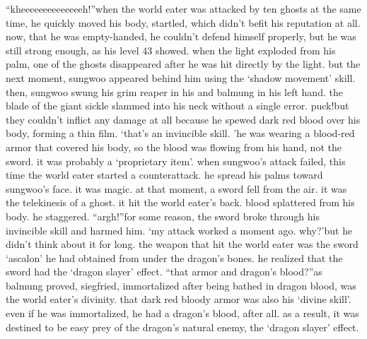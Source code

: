 “kheeeeeeeeeeeeeeh!”when the world eater was attacked by ten ghosts at the same time, he quickly moved his body, startled, which didn’t befit his reputation at all.
 now, that he was empty-handed, he couldn’t defend himself properly, but he was still strong enough, as his level 43 showed.
when the light exploded from his palm, one of the ghosts disappeared after he was hit directly by the light.
 but the next moment, sungwoo appeared behind him using the ‘shadow movement’ skill.
 then, sungwoo swung his grim reaper in his and balmung in his left hand.
the blade of the giant sickle slammed into his neck without a single error.
puck!but they couldn’t inflict any damage at all because he spewed dark red blood over his body, forming a thin film.
‘that’s an invincible skill.
’he was wearing a blood-red armor that covered his body, so the blood was flowing from his hand, not the sword.
 it was probably a ‘proprietary item’.
when sungwoo’s attack failed, this time the world eater started a counterattack.
 he spread his palms toward sungwoo’s face.
 it was magic.
at that moment, a sword fell from the air.
 it was the telekinesis of a ghost.
 it hit the world eater’s back.
blood splattered from his body.
 he staggered.
“argh!”for some reason, the sword broke through his invincible skill and harmed him.
‘my attack worked a moment ago.
 why?’but he didn’t think about it for long.
 the weapon that hit the world eater was the sword ‘ascalon’ he had obtained from under the dragon’s bones.
 he realized that the sword had the ‘dragon slayer’ effect.
“that armor and dragon’s blood?”as balmung proved, siegfried, immortalized after being bathed in dragon blood, was the world eater’s divinity.
 that dark red bloody armor was also his ‘divine skill’.
even if he was immortalized, he had a dragon’s blood, after all.
 as a result, it was destined to be easy prey of the dragon’s natural enemy, the ‘dragon slayer’ effect.


